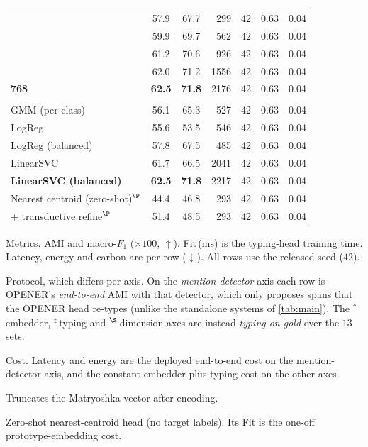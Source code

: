 \begin{table}[tbp]
\begin{threeparttable}
\begin{tabular}{lccrrrr}
\addlinespace
\multicolumn{7}{l}{\emph{Matryoshka dimension}$^\S$} \\
\quad 64                             & 57.9 & 67.7 & 299 & 42 & 0.63 & 0.04 \\
\quad 128                            & 59.9 & 69.7 & 562 & 42 & 0.63 & 0.04 \\
\quad 256                            & 61.2 & 70.6 & 926 & 42 & 0.63 & 0.04 \\
\quad 512                            & 62.0 & 71.2 & 1556 & 42 & 0.63 & 0.04 \\
\quad \textbf{768}                   & \textbf{62.5} & \textbf{71.8} & 2176 & 42 & 0.63 & 0.04 \\
\addlinespace
\multicolumn{7}{l}{\emph{Entity typing}$^\ddagger$} \\
\quad GMM (per-class)                & 56.1 & 65.3 & 527 & 42 & 0.63 & 0.04 \\
\quad LogReg                         & 55.6 & 53.5 & 546 & 42 & 0.63 & 0.04 \\
\quad LogReg (balanced)              & 57.8 & 67.5 & 485 & 42 & 0.63 & 0.04 \\
\quad LinearSVC                      & 61.7 & 66.5 & 2041 & 42 & 0.63 & 0.04 \\
\quad \textbf{LinearSVC (balanced)}  & \textbf{62.5} & \textbf{71.8} & 2217 & 42 & 0.63 & 0.04 \\
\quad Nearest centroid (zero-shot)$^\P$ & 44.4 & 46.8 & 293 & 42 & 0.63 & 0.04 \\
\quad \quad + transductive refine$^\P$ & 51.4 & 48.5 & 293 & 42 & 0.63 & 0.04 \\
\bottomrule
\end{tabular}
\begin{tablenotes}[flushleft]
\footnotesize
\item[] Metrics. AMI and macro-$F_1$ ($\times100$, $\uparrow$). Fit\,(ms) is the typing-head training time. Latency, energy and carbon are per row ($\downarrow$). All rows use the released seed ($42$).
\item[] Protocol, which differs per axis. On the \emph{mention-detector} axis each row is OPENER's \emph{end-to-end} AMI with that detector, which only proposes spans that the OPENER head re-types (unlike the standalone systems of \autoref{tab:main}). The $^\ast$\,embedder, $^\ddagger$\,typing and $^\S$\,dimension axes are instead \emph{typing-on-gold} over the $13$ sets. \item[] Cost. Latency and energy are the deployed end-to-end cost on the mention-detector axis, and the constant embedder-plus-typing cost on the other axes. \item[$\S$] Truncates the Matryoshka vector after encoding.\item[$\P$] Zero-shot nearest-centroid head (no target labels). Its Fit is the one-off prototype-embedding cost.
\end{tablenotes}
\end{threeparttable}
\end{table}

